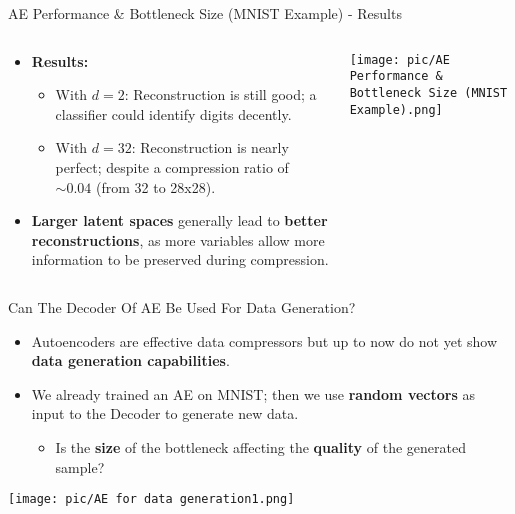 \documentclass[serif, aspectratio=169]{beamer}
\begin{document}
\begin{frame}{AE Performance \& Bottleneck Size (MNIST Example) - Results}
    \begin{columns}[t] 
        \begin{column}{0.65\textwidth} 
            \begin{itemize}
                \item \textbf{Results:}
                \begin{itemize}
                    \item With \( d=2 \): Reconstruction is still good; a classifier could identify digits decently.
                    \item With \( d=32 \): Reconstruction is nearly perfect; despite a compression ratio of \(\sim0.04\) (from 32 to 28x28).
                \end{itemize}
                
                \item \textbf{Larger latent spaces} generally lead to \textbf{better reconstructions}, as more variables allow more information to be preserved during compression.
            \end{itemize}
        \end{column}
        
        \begin{column}{0.33\textwidth} %
            \begin{center}
                \texttt{[image: pic/AE Performance \& Bottleneck Size (MNIST Example).png]} 
                    \vspace{2.5cm}
            \end{center}
        \end{column}
    \end{columns}
\end{frame}

\begin{frame}{Can The Decoder Of AE Be Used For Data Generation?}
    \small
    \begin{itemize}
        \item Autoencoders are effective data compressors but up to now do not yet show \textbf{data generation capabilities}.
        \item We already trained an AE on MNIST; then we use \textbf{random vectors} as input to the Decoder to generate new data.
        \begin{itemize}
            \item Is the \textbf{size} of the bottleneck affecting the \textbf{quality} of the generated sample?
        \end{itemize}
    \end{itemize}
    
    
    \begin{center}
        \texttt{[image: pic/AE for data generation1.png]}
    \end{center}
\end{frame}
\end{document}

